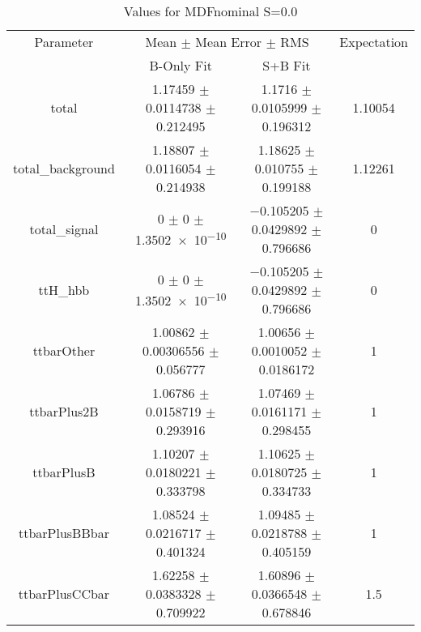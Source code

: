 \begin{table}
\centering
\caption{Values for MDFnominal S=0.0}
\begin{tabular}{cccc}
\toprule
Parameter & \multicolumn{2}{c}{Mean $\pm$ Mean Error $\pm$ RMS} & Expectation\\
 & B-Only Fit & S+B Fit & \\
\midrule
total & \num{1.17459} $\pm$ \num{0.0114738} $\pm$ \num{0.212495} & \num{1.1716} $\pm$ \num{0.0105999} $\pm$ \num{0.196312} & \num{1.10054}\\
total\_background & \num{1.18807} $\pm$ \num{0.0116054} $\pm$ \num{0.214938} & \num{1.18625} $\pm$ \num{0.010755} $\pm$ \num{0.199188} & \num{1.12261}\\
total\_signal & \num{0} $\pm$ \num{0} $\pm$ \num{1.3502e-10} & \num{-0.105205} $\pm$ \num{0.0429892} $\pm$ \num{0.796686} & \num{0}\\
ttH\_hbb & \num{0} $\pm$ \num{0} $\pm$ \num{1.3502e-10} & \num{-0.105205} $\pm$ \num{0.0429892} $\pm$ \num{0.796686} & \num{0}\\
ttbarOther & \num{1.00862} $\pm$ \num{0.00306556} $\pm$ \num{0.056777} & \num{1.00656} $\pm$ \num{0.0010052} $\pm$ \num{0.0186172} & \num{1}\\
ttbarPlus2B & \num{1.06786} $\pm$ \num{0.0158719} $\pm$ \num{0.293916} & \num{1.07469} $\pm$ \num{0.0161171} $\pm$ \num{0.298455} & \num{1}\\
ttbarPlusB & \num{1.10207} $\pm$ \num{0.0180221} $\pm$ \num{0.333798} & \num{1.10625} $\pm$ \num{0.0180725} $\pm$ \num{0.334733} & \num{1}\\
ttbarPlusBBbar & \num{1.08524} $\pm$ \num{0.0216717} $\pm$ \num{0.401324} & \num{1.09485} $\pm$ \num{0.0218788} $\pm$ \num{0.405159} & \num{1}\\
ttbarPlusCCbar & \num{1.62258} $\pm$ \num{0.0383328} $\pm$ \num{0.709922} & \num{1.60896} $\pm$ \num{0.0366548} $\pm$ \num{0.678846} & \num{1.5}\\
\bottomrule
\end{tabular}
\end{table}